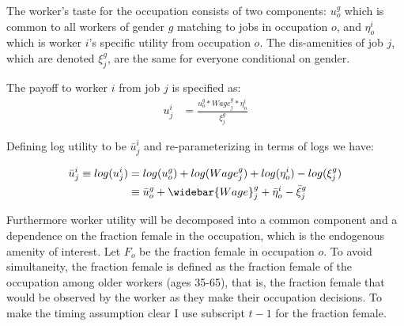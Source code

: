 \documentclass[12pt]{article}
\begin{document}
The worker's taste for the occupation consists of two components: $u^g_o$ which is common to all workers of gender $g$ matching to jobs in occupation $o$, and $\eta^i_o$ which is worker $i$'s specific utility from occupation $o$. The dis-amenities of job $j$, which are denoted $\xi^g_j$, are the same for everyone conditional on gender.


The payoff to worker $i$ from job $j$ is specified as:
\begin{align} \label{worker}
u^i_j &= \frac{ u^g_o*Wage^g_j *  \eta^i_o } {\xi^g_j}    
\end{align}

Defining log utility to be $\bar{u}^{i}_j$ and re-parameterizing in terms of logs we have:

\begin{align} \label{logworker}
\bar{u}^{i}_j \equiv log(u^i_j) &= log(u^g_o) + log(Wage^g_j)  + log(\eta^i_o) - log(\xi^g_j)   \\ \nonumber
&\equiv  \bar{u}^{g}_o + \widebar{Wage}^g_j   + \bar{\eta}^i_o - \bar{\xi}^g_j 
\end{align}





Furthermore worker utility will be decomposed into a common component and a dependence on the fraction female in the occupation, which is the endogenous amenity of interest. Let $F_o$ be the fraction female in occupation $o$. To avoid simultaneity, the fraction female is defined as the fraction female of the occupation among older workers (ages 35-65), that is, the fraction female that would be observed by the worker as they make their occupation decisions. To make the timing assumption clear I use subscript $t-1$ for the fraction female.
\end{document}
